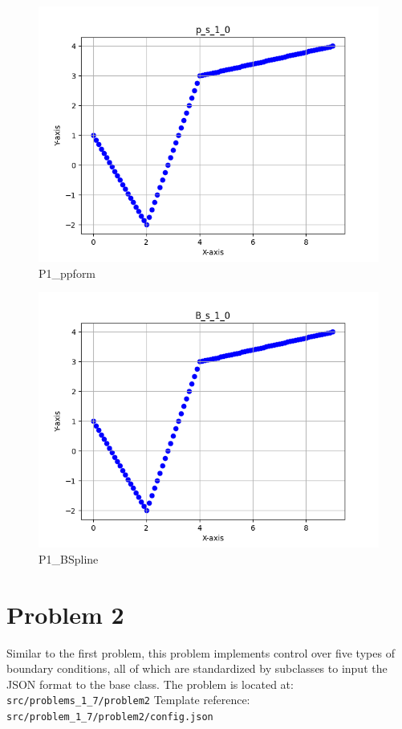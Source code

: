 \documentclass[a4paper]{article}
\begin{document}
\begin{figure}[H] 
    \centering
    \includegraphics{../figure/p_s_1_0.png}
    \caption{P1\_ppform}
\end{figure}

\begin{figure}[H] 
    \centering
    \includegraphics{../figure/B_s_1_0.png}
    \caption{P1\_BSpline}
\end{figure}

\section*{Problem 2}
Similar to the first problem, this problem implements control over five types of boundary conditions, all of which are standardized by subclasses to input the JSON format to the base class.
The problem is located at: \texttt{src/problems\_1\_7/problem2}
Template reference: \texttt{src/problem\_1\_7/problem2/config.json}
\end{document}
